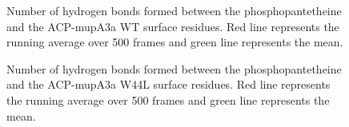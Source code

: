 \begin{singlespacing}
		\setlength\fboxsep{5pt}
		\setlength\fboxrule{1.5pt}
		\begin{figure}[htbp]
		\centering
		\caption[Number of hydrogen bonds formed between the phosphopantetheine and the ACP-mupA3a WT surface residues.]{Number of hydrogen bonds formed between the phosphopantetheine and the ACP-mupA3a WT surface residues.  Red line represents the running average over 500 frames and green line represents the mean.}
		\label{fig:HbondACPPPTWild_protein}
		\end{figure}

		\setlength\fboxsep{5pt}
		\setlength\fboxrule{1.5pt}
		\begin{figure}[htbp]
		\centering
		\caption[Number of hydrogen bonds formed between the phosphopantetheine and the ACP-mupA3a W44L surface residues.]{Number of hydrogen bonds formed between the phosphopantetheine and the ACP-mupA3a W44L surface residues.  Red line represents the running average over 500 frames and green line represents the mean.}
		\label{fig:HbondACPPPTMutant_protein}
		\end{figure}


\end{singlespacing}
